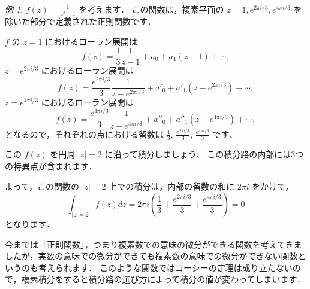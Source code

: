 \documentclass{ltjsarticle}
\newcommand{\abs}[1]{\left\lvert #1\right\rvert}
\theoremstyle{definition}
\theoremstyle{remark}
\newtheorem{example}{例}
\begin{document}
\begin{example}
  $f(z)=\frac{1}{z^3-1}$
  を考えます．
  この関数は，複素平面の $z=1,e^{2\pi i/3},e^{4\pi i/3}$ を除いた部分で定義された正則関数です．

  $f$ の $z=1$ におけるローラン展開は
  \[
  f(z)
  =\frac{1}{3}\frac{1}{z-1}+a_0+a_1(z-1)+\dotsb, %
  \]
  $z=e^{2\pi i/3}$ におけるローラン展開は
  \[
  f(z)
  =\frac{e^{2\pi i/3}}{3}\frac{1}{z-e^{2\pi i/3}}+a'_0+a'_1(z-e^{2\pi i/3})+\dotsb, %
  \]
  $z=e^{4\pi i/3}$ におけるローラン展開は
  \[
  f(z)
  =\frac{e^{4\pi i/3}}{3}\frac{1}{z-e^{4\pi i/3}}+a''_0+a''_1(z-e^{4\pi i/3})+\dotsb,
  \]
  となるので，それぞれの点における留数は $\frac{1}{3}$, $\frac{e^{2\pi i/3}}{3}$, $\frac{e^{4\pi i/3}}{3}$ です．

  この $f(z)$ を円周 $\abs{z}=2$ に沿って積分しましょう．
  この積分路の内部には3つの特異点が含まれます．
  \begin{center}
  \end{center}
  よって，この関数の $\abs{z}=2$ 上での積分は，内部の留数の和に $2\pi i$ をかけて，
  \[\int_{\abs{z}=2} f(z)dz=2\pi i\left(\frac{1}{3}+\frac{e^{2\pi i/3}}{3}+\frac{e^{4\pi i/3}}{3}\right)=0\]
  となります．
\end{example}



今までは「正則関数」，つまり複素数での意味の微分ができる関数を考えてきましたが，実数の意味での微分ができても複素数の意味での微分ができない関数というのも考えられます．
このような関数ではコーシーの定理は成り立たないので，複素積分をすると積分路の選び方によって積分の値が変わってしまいます．
\end{document}
